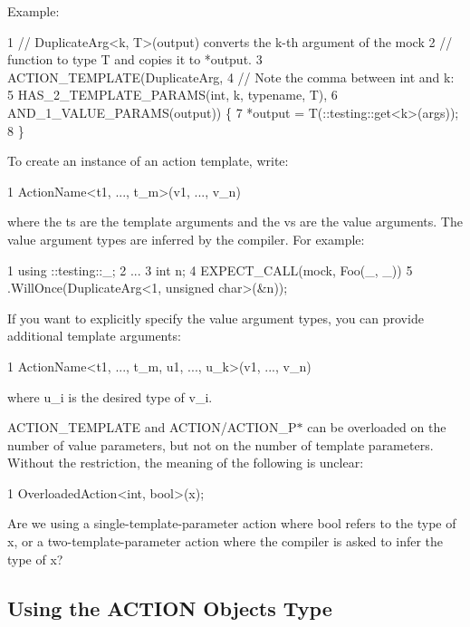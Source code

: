 Example\+: 
\begin{DoxyCode}
1 // DuplicateArg<k, T>(output) converts the k-th argument of the mock
2 // function to type T and copies it to *output.
3 ACTION\_TEMPLATE(DuplicateArg,
4                 // Note the comma between int and k:
5                 HAS\_2\_TEMPLATE\_PARAMS(int, k, typename, T),
6                 AND\_1\_VALUE\_PARAMS(output)) \{
7   *output = T(::testing::get<k>(args));
8 \}
\end{DoxyCode}


To create an instance of an action template, write\+: 
\begin{DoxyCode}
1 ActionName<t1, ..., t\_m>(v1, ..., v\_n)
\end{DoxyCode}
 where the {\ttfamily t}s are the template arguments and the {\ttfamily v}s are the value arguments. The value argument types are inferred by the compiler. For example\+: 
\begin{DoxyCode}
1 using ::testing::\_;
2 ...
3   int n;
4   EXPECT\_CALL(mock, Foo(\_, \_))
5       .WillOnce(DuplicateArg<1, unsigned char>(&n));
\end{DoxyCode}


If you want to explicitly specify the value argument types, you can provide additional template arguments\+: 
\begin{DoxyCode}
1 ActionName<t1, ..., t\_m, u1, ..., u\_k>(v1, ..., v\_n)
\end{DoxyCode}
 where {\ttfamily u\+\_\+i} is the desired type of {\ttfamily v\+\_\+i}.

{\ttfamily A\+C\+T\+I\+O\+N\+\_\+\+T\+E\+M\+P\+L\+A\+TE} and {\ttfamily A\+C\+T\+I\+ON}/{\ttfamily A\+C\+T\+I\+O\+N\+\_\+\+P$\ast$} can be overloaded on the number of value parameters, but not on the number of template parameters. Without the restriction, the meaning of the following is unclear\+:


\begin{DoxyCode}
1 OverloadedAction<int, bool>(x);
\end{DoxyCode}


Are we using a single-\/template-\/parameter action where {\ttfamily bool} refers to the type of {\ttfamily x}, or a two-\/template-\/parameter action where the compiler is asked to infer the type of {\ttfamily x}?

\subsection*{Using the A\+C\+T\+I\+ON Object\textquotesingle{}s Type}

